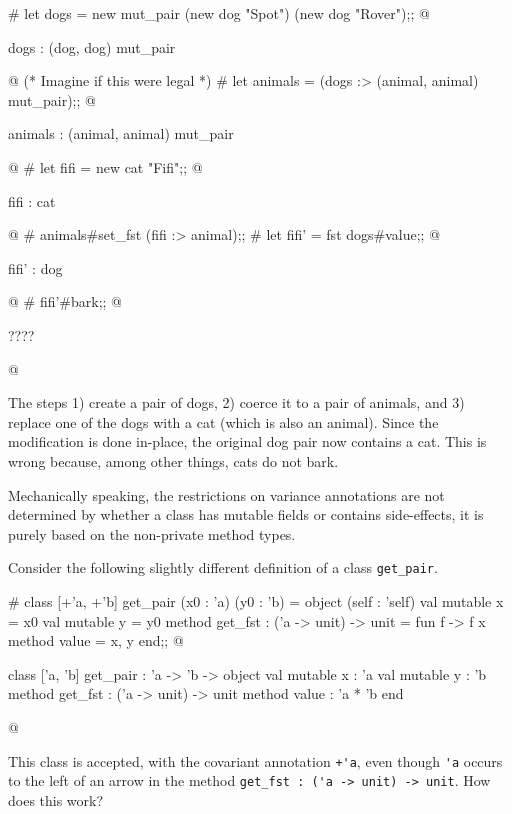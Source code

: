 \begin{ocaml}
# let dogs = new mut_pair (new dog "Spot") (new dog "Rover");;
@
\begin{topoutput}
dogs : (dog, dog) mut_pair
\end{topoutput}
@
  (* Imagine if this were legal *)
# let animals = (dogs :> (animal, animal) mut_pair);;
@
\begin{topoutput}
animals : (animal, animal) mut_pair
\end{topoutput}
@
# let fifi = new cat "Fifi";;
@
\begin{topoutput}
fifi : cat
\end{topoutput}
@
# animals#set_fst (fifi :> animal);;
# let fifi' = fst dogs#value;;
@
\begin{topoutput}
fifi' : dog
\end{topoutput}
@
# fifi'#bark;;
@
\begin{toperror}
????
\end{toperror}
@
\end{ocaml}
%
The steps 1) create a pair of dogs, 2) coerce it to a pair of animals,
and 3) replace one of the dogs with a cat (which is also an animal).
Since the modification is done in-place, the original dog pair now
contains a cat.  This is wrong because, among other things, cats do
not bark.


Mechanically speaking, the restrictions on variance annotations are
not determined by whether a class has mutable fields or contains
side-effects, it is purely based on the non-private method types.

Consider the following slightly different definition of a
class \hbox{\lstinline$get_pair$}.

\begin{ocaml}
# class [+'a, +'b] get_pair (x0 : 'a) (y0 : 'b) =
    object (self : 'self)
      val mutable x = x0
      val mutable y = y0
      method get_fst : ('a -> unit) -> unit = fun f -> f x
      method value = x, y
    end;;
@
\begin{topoutput}
class ['a, 'b] get_pair : 'a -> 'b ->
  object
    val mutable x : 'a
    val mutable y : 'b
    method get_fst : ('a -> unit) -> unit
    method value : 'a * 'b
  end
\end{topoutput}
@
\end{ocaml}
%
This class is accepted, with the covariant annotation \hbox{\lstinline$+'a$}, even
though \hbox{\lstinline$'a$} occurs to the left of an arrow in the
method \hbox{\lstinline$get_fst : ('a -> unit) -> unit$}.  How does this work?

